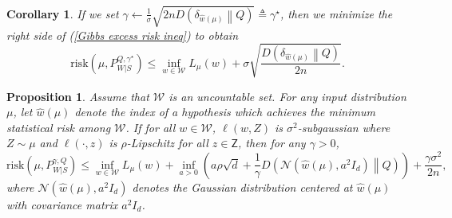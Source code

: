 \documentclass{article}
\newtheorem{proposition}{Proposition}
\newtheorem{corollary}{Corollary}
\newcommand{\risk}[0]{\mathrm{risk}}
\newcommand{\W}[0]{\mathcal{W}}
\begin{document}
\begin{corollary}
	If we set $\gamma \leftarrow \frac{1}{\sigma}\sqrt{2n D\left(\delta_{\widehat{w}(\mu)}\middle\|Q\right)}\triangleq \gamma^{\star}$, then we minimize the right side of (\ref{Gibbs excess risk ineq}) to obtain
	\begin{equation}
	    \risk\left(\mu, P_{W|S}^{Q, \gamma^{\star}}\right)\leq  \inf_{w\in\W} L_{\mu}(w)+\sigma\sqrt{\frac{D\left(\delta_{\widehat{w}(\mu)}\middle\|Q\right)}{2n}}.\nonumber
	\end{equation}
\end{corollary}

\begin{proposition}\label{Gibbs excess risk uncountable} Assume that $\W$ is an uncountable set. For any input distribution $\mu$, let $\widehat{w}(\mu)$ denote the index of a hypothesis which achieves the minimum statistical risk among $\W$. If for all $w\in\W$, $\ell(w,Z)$ is $\sigma^2$-subgaussian where $Z \sim \mu$ and $\ell(\cdot ,z)$ is $\rho$-Lipschitz for all $z\in \mathsf{Z}$, then for any $\gamma>0$,
	\begin{equation}
		\risk\left(\mu, P_{W|S}^{\gamma, Q}\right)\leq \inf_{w\in\W} L_{\mu}(w)+\inf_{a>0}\left(a\rho\sqrt{d} + \frac{1}{\gamma}D\left(\mathcal{N}\left(\widehat{w}(\mu), a^2I_d\right)\middle\|Q \right) \right)+\frac{\gamma\sigma^2}{2n},  \nonumber
	\end{equation}
	where $\mathcal{N}\left(\widehat{w}(\mu), a^2I_d\right)$ denotes the Gaussian distribution centered at $\widehat{w}(\mu)$ with covariance matrix $a^2I_d$.
\end{proposition}
\end{document}
